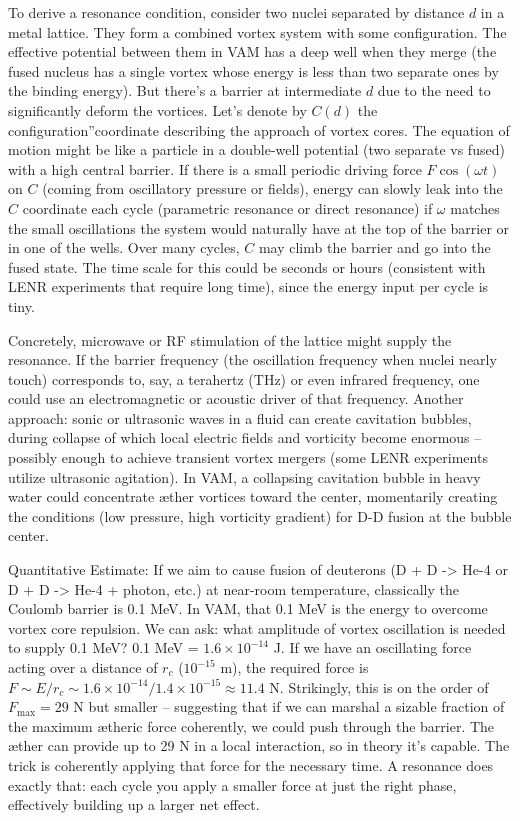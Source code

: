 To derive a resonance condition, consider two nuclei separated by distance $d$ in a metal lattice. They form a combined vortex system with some configuration. The effective potential between them in VAM has a deep well when they merge (the fused nucleus has a single vortex whose energy is less than two separate ones by the binding energy). But there's a barrier at intermediate $d$ due to the need to significantly deform the vortices. Let's denote by $C(d)$ the \grqq configuration\textquotedblright coordinate describing the approach of vortex cores. The equation of motion might be like a particle in a double-well potential (two separate vs fused) with a high central barrier. If there is a small periodic driving force $F \cos(\omega t)$ on $C$ (coming from oscillatory pressure or fields), energy can slowly leak into the $C$ coordinate each cycle (parametric resonance or direct resonance) if $\omega$ matches the small oscillations the system would naturally have at the top of the barrier or in one of the wells. Over many cycles, $C$ may climb the barrier and go into the fused state. The time scale for this could be seconds or hours (consistent with LENR experiments that require long time), since the energy input per cycle is tiny.


Concretely, microwave or RF stimulation of the lattice might supply the resonance. If the barrier frequency (the oscillation frequency when nuclei nearly touch) corresponds to, say, a terahertz (THz) or even infrared frequency, one could use an electromagnetic or acoustic driver of that frequency. Another approach: sonic or ultrasonic waves in a fluid can create cavitation bubbles, during collapse of which local electric fields and vorticity become enormous – possibly enough to achieve transient vortex mergers (some LENR experiments utilize ultrasonic agitation). In VAM, a collapsing cavitation bubble in heavy water could concentrate æther vortices toward the center, momentarily creating the conditions (low pressure, high vorticity gradient) for D-D fusion at the bubble center.


Quantitative Estimate: If we aim to cause fusion of deuterons (D + D -> He-4 or D + D -> He-4 + photon, etc.) at near-room temperature, classically the Coulomb barrier is 0.1 MeV. In VAM, that 0.1 MeV is the energy to overcome vortex core repulsion. We can ask: what amplitude of vortex oscillation is needed to supply 0.1 MeV? 0.1 MeV = $1.6\times10^{-14}$ J. If we have an oscillating force acting over a distance of $r_c$ ($10^{-15}$ m), the required force is $F \sim E/r_c \sim 1.6\times10^{-14} / 1.4\times10^{-15} \approx 11.4$ N. Strikingly, this is on the order of $F_{\max}=29$ N but smaller – suggesting that if we can marshal a sizable fraction of the maximum ætheric force coherently, we could push through the barrier. The æther can provide up to 29 N in a local interaction, so in theory it's capable. The trick is coherently applying that force for the necessary time. A resonance does exactly that: each cycle you apply a smaller force at just the right phase, effectively building up a larger net effect.


